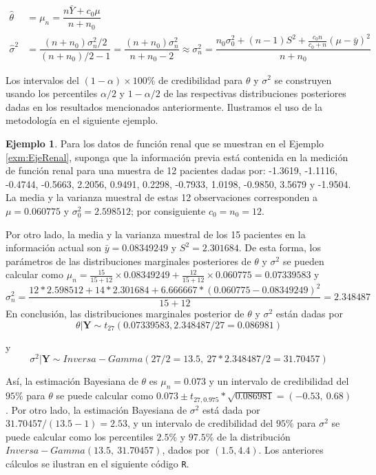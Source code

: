 \documentclass[
  10pt,
  spanish,
]{book}
\theoremstyle{definition}
\theoremstyle{definition}
\newtheorem{example}{Ejemplo}[chapter]
\theoremstyle{definition}
\theoremstyle{definition}
\theoremstyle{remark}
\begin{document}
\begin{align*}
\hat{\theta}
&=\mu_n=\dfrac{n\bar{Y}+c_0\mu}{n+n_0}\\
\hat{\sigma}^2
&=\dfrac{(n+n_0)\sigma^2_n/2}{(n+n_0)/2-1}=\dfrac{(n+n_0)\sigma^2_n}{n+n_0-2}\approx\sigma^2_n=\dfrac{n_0\sigma^2_0+(n-1)S^2+\frac{c_0n}{c_0+n}(\mu-\bar{y})^2}{n+n_0}
\end{align*}

Los intervalos del \((1-\alpha)\times 100\%\) de credibilidad para \(\theta\) y \(\sigma^2\) se construyen usando los percentiles \(\alpha/2\) y \(1-\alpha/2\) de las respectivas distribuciones posteriores dadas en los resultados mencionados anteriormente. Ilustramos el uso de la metodología en el siguiente ejemplo.

\begin{example}
\protect\hypertarget{exm:unnamed-chunk-18}{}{\label{exm:unnamed-chunk-18} }Para los datos de función renal \cite{Efronims} que se muestran en el Ejemplo \ref{exm:EjeRenal}, suponga que la información previa está contenida en la medición de función renal para una muestra de 12 pacientes dadas por: -1.3619, -1.1116, -0.4744, -0.5663, 2.2056, 0.9491, 0.2298, -0.7933, 1.0198, -0.9850, 3.5679 y -1.9504. La media y la varianza muestral de estas 12 observaciones corresponden a \(\mu=0.060775\) y \(\sigma^2_0=2.598512\); por consiguiente \(c_0=n_0=12\).

Por otro lado, la media y la varianza muestral de los 15 pacientes en la información actual son \(\bar{y}=0.08349249\) y \(S^2=2.301684\). De esta forma, los parámetros de las distribuciones marginales posteriores de \(\theta\) y \(\sigma^2\) se pueden calcular como \(\mu_n=\frac{15}{15+12}\times 0.08349249+\frac{12}{15+12}\times 0.060775=0.07339583\) y \[\sigma^2_n=\dfrac{12*2.598512+14*2.301684+6.666667*(0.060775-0.08349249)^2}{15+12}=2.348487\] En conclusión, las distribuciones marginales posterior de \(\theta\) y \(\sigma^2\) están dadas por
\begin{equation*}
\theta|\mathbf{Y}\sim t_{27}(0.07339583,2.348487/27=0.086981)
\end{equation*}

y
\begin{equation*}
\sigma^2|\mathbf{Y}\sim Inversa-Gamma(27/2=13.5,\ 27*2.348487/2=31.70457)
\end{equation*}

Así, la estimación Bayesiana de \(\theta\) es \(\mu_n=0.073\) y un intervalo de credibilidad del \(95\%\) para \(\theta\) se puede calcular como \(0.073\pm t_{27,0.975}*\sqrt{0.086981}=(-0.53,\ 0.68)\). Por otro lado, la estimación Bayesiana de \(\sigma^2\) está dada por \(31.70457/(13.5-1)=2.53\), y un intervalo de credibilidad del \(95\%\) para \(\sigma^2\) se puede calcular como los percentiles \(2.5\%\) y \(97.5\%\) de la distribución \(Inversa-Gamma(13.5,\ 31.70457)\), dados por \((1.5, 4.4)\). Los anteriores cálculos se ilustran en el siguiente código \texttt{R}.
\end{example}
\end{document}
